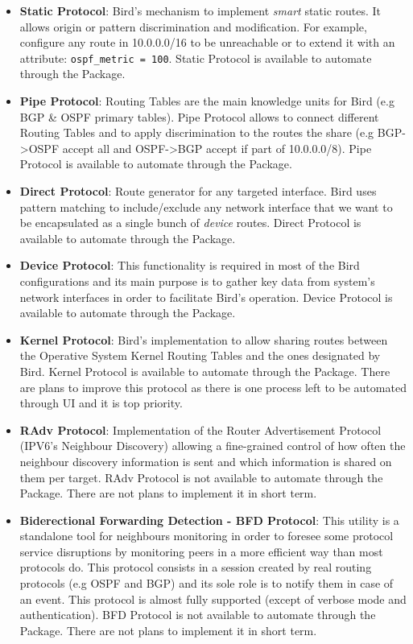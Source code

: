 \begin{itemize}
    \item \textbf{Static Protocol}: Bird's mechanism to implement \textit{smart} static routes. It allows  origin or pattern discrimination and modification. For example, configure any route in 10.0.0.0/16 to be unreachable or to extend it with an attribute: \texttt{ospf\_metric = 100}.
    Static Protocol is available to automate through the Package.
    \item \textbf{Pipe Protocol}: Routing Tables are the main knowledge units for Bird (e.g BGP \& OSPF primary tables). Pipe Protocol allows to connect different Routing Tables and to apply discrimination to the routes the share (e.g BGP->OSPF accept all and OSPF->BGP accept if part of 10.0.0.0/8).
    Pipe Protocol is available to automate through the Package.
    \item \textbf{Direct Protocol}: Route generator for any targeted interface. Bird uses pattern matching to include/exclude any network interface that we want to be encapsulated as a single bunch of \textit{device} routes.
    Direct Protocol is available to automate through the Package.
    \item \textbf{Device Protocol}: This functionality is required in most of the Bird configurations and its main purpose is to gather key data from system's network interfaces in order to facilitate Bird's operation.
    Device Protocol is available to automate through the Package.
    \item \textbf{Kernel Protocol}: Bird's implementation to allow sharing routes between the Operative System Kernel Routing Tables and the ones designated by Bird.
    Kernel Protocol is available to automate through the Package. There are plans to improve this protocol as there is one process left to be automated through UI and it is top priority.
    \item \textbf{RAdv Protocol}: Implementation of the Router Advertisement Protocol (IPV6's Neighbour Discovery) allowing a fine-grained control of how often the neighbour discovery information is sent and which information is shared on them per target.
    RAdv Protocol is not available to automate through the Package. There are not plans to implement it in short term.
    \item \textbf{Biderectional Forwarding Detection - BFD Protocol}: This utility is a standalone tool for neighbours monitoring in order to foresee some protocol service disruptions by monitoring peers in a more efficient way than most protocols do. This protocol consists in a session created by real routing protocols (e.g OSPF and BGP) and its sole role is to notify them in case of an event. This protocol is almost fully supported (except of verbose mode and authentication).
    BFD Protocol is not available to automate through the Package. There are not plans to implement it in short term.
\end{itemize}

